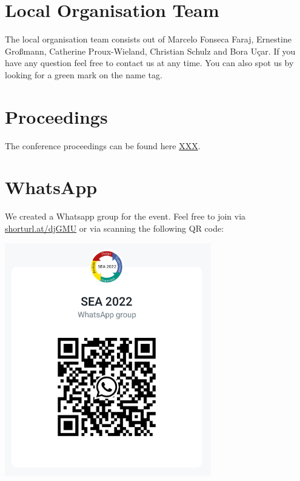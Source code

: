 \documentclass{article}
\begin{document}
\section{Local Organisation Team}
The local organisation team consists out of Marcelo Fonseca Faraj, Ernestine Großmann, Catherine Proux-Wieland, Christian Schulz and Bora Uçar. If you have any question feel free to contact us at any time. You can also spot us by looking for a green mark on the name tag.

\section{Proceedings}
The conference proceedings can be found here \url{XXX}.
\vfill
\pagebreak
\section{WhatsApp}
We created a Whatsapp group for the event. Feel free to join via \url{shorturl.at/djGMU} or via scanning the following QR code:
\vspace*{1cm}

\begin{center}
        \includegraphics[width=9cm]{whatsapp.jpg}
\end{center}
\end{document}
